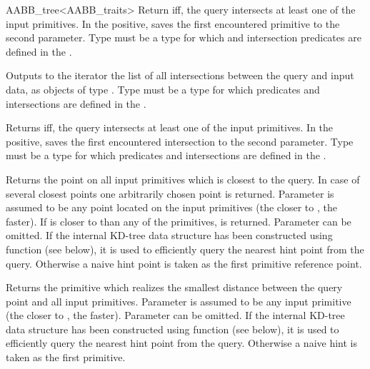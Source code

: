\begin{ccRefClass}{AABB_tree<AABB_traits>}
{Return  iff, the query intersects at least one of the input primitives. In the positive, saves the first encountered primitive to the second parameter. Type  must be a type for which  and intersection predicates are defined in the .}

	
{Outputs to the iterator the list of all intersections between the query and input data, as objects of type . Type  must be a type for which  predicates and intersections are defined in the .}

{Returns  iff, the query intersects at least one of the input primitives. In the positive, saves the first encountered intersection to the second parameter. Type  must be a type for which  predicates and intersections are defined in the .}



{Returns the point on all input primitives which is closest to the query. In case of several closest points one arbitrarily chosen point is returned.  Parameter  is assumed to be any point located on the input primitives (the closer  to , the faster). If  is closer to  than any of the primitives,  is returned. Parameter  can be omitted. If the internal KD-tree data structure has been constructed using function  (see below), it is used to efficiently query the nearest hint point from the query. Otherwise a naive hint point is taken as the first primitive reference point. }

{Returns the primitive which realizes the smallest distance between the query point and all input primitives. Parameter  is assumed to be any input primitive (the closer  to , the faster). Parameter  can be omitted. If the internal KD-tree data structure has been constructed using function  (see below), it is used to efficiently query the nearest hint point from the query. Otherwise a naive hint is taken as the first primitive. }


\end{ccRefClass}
